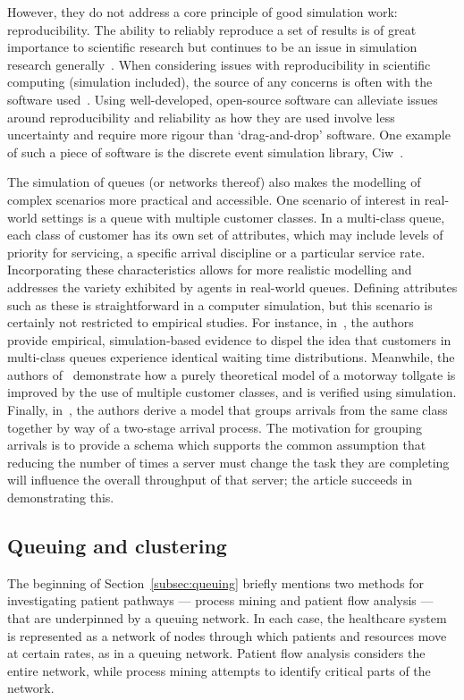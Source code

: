 However, they do not address a core principle of good simulation work:
reproducibility. The ability to reliably reproduce a set of results is of great
importance to scientific research but continues to be an issue in simulation
research generally~\cite{Fitzpatrick2019,Taylor2018}. When considering issues
with reproducibility in scientific computing (simulation included), the source
of any concerns is often with the software used~\cite{Ivie2018}. Using
well-developed, open-source software can alleviate issues around reproducibility
and reliability as how they are used involve less uncertainty and require more
rigour than `drag-and-drop' software. One example of such a piece of software is
the discrete event simulation library, Ciw~\cite{Palmer2019}.

The simulation of queues (or networks thereof) also makes the modelling of
complex scenarios more practical and accessible. One scenario of interest in
real-world settings is a queue with multiple customer classes. In a multi-class
queue, each class of customer has its own set of attributes, which may include
levels of priority for servicing, a specific arrival discipline or a particular
service rate. Incorporating these characteristics allows for more realistic
modelling and addresses the variety exhibited by agents in real-world queues.
Defining attributes such as these is straightforward in a computer simulation,
but this scenario is certainly not restricted to empirical studies. For
instance, in~\cite{RomeroSilva2017}, the authors provide empirical,
simulation-based evidence to dispel the idea that customers in multi-class
queues experience identical waiting time distributions. Meanwhile, the authors
of~\cite{Pompigna2020} demonstrate how a purely theoretical model of a motorway
tollgate is improved by the use of multiple customer classes, and is verified
using simulation. Finally, in~\cite{Reveil2014}, the authors derive a model that
groups arrivals from the same class together by way of a two-stage arrival
process. The motivation for grouping arrivals is to provide a schema which
supports the common assumption that reducing the number of times a server must
change the task they are completing will influence the overall throughput of
that server; the article succeeds in demonstrating this.

\subsection{Queuing and clustering}

The beginning of Section~\ref{subsec:queuing} briefly mentions two methods
for investigating patient pathways --- process mining and patient flow analysis
--- that are underpinned by a queuing network. In each case, the healthcare
system is represented as a network of nodes through which patients and resources
move at certain rates, as in a queuing network. Patient flow analysis considers
the entire network, while process mining attempts to identify critical parts of
the network.

